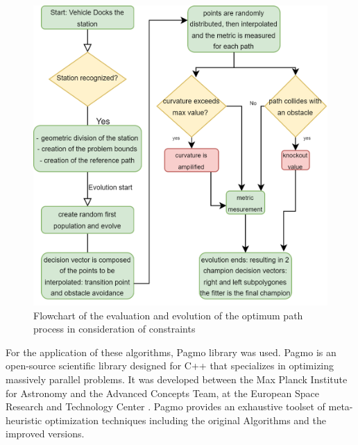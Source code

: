\begin{figure}[H]
    \begin{center}
        \includegraphics[width=5in]{images/Chap2/Opt_chart.png} %
        \caption{Flowchart of the evaluation and evolution of the optimum path process in consideration of constraints}
        \label{Opt_chart}
        \end{center}    
\end{figure}


For the application of these algorithms, Pagmo library was used. Pagmo is an open-source scientific library designed for 
C++ that specializes in optimizing massively parallel problems. It was developed between the Max Planck Institute for 
Astronomy and the Advanced Concepts Team, at the European Space Research and Technology Center \cite{R45}.
Pagmo provides an exhaustive toolset of meta-heuristic optimization techniques including the original Algorithms
and the improved versions. 

